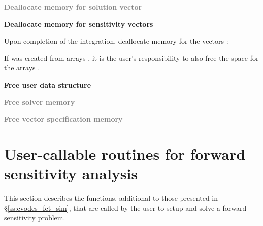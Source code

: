 \begin{Steps}
\item
  \textcolor{gray}{\bf Deallocate memory for solution vector}

\item 
  {\bf Deallocate memory for sensitivity vectors}

  Upon completion of the integration, deallocate memory for the vectors :

  {\s} 

  {\p} 

  If  was created from  arrays , it is the
  user's responsibility to also free the space for the arrays .

\item
  {\bf Free user data structure}

\item
  \textcolor{gray}{\bf Free solver memory}
  
\item
  \textcolor{gray}{\bf Free vector specification memory}

\end{Steps}

\section{User-callable routines for forward sensitivity analysis}

This section describes the {\cvodes} functions, additional to those presented
in \S\ref{ss:cvodes_fct_sim}, that are called by the user to setup and solve
a forward sensitivity problem.

